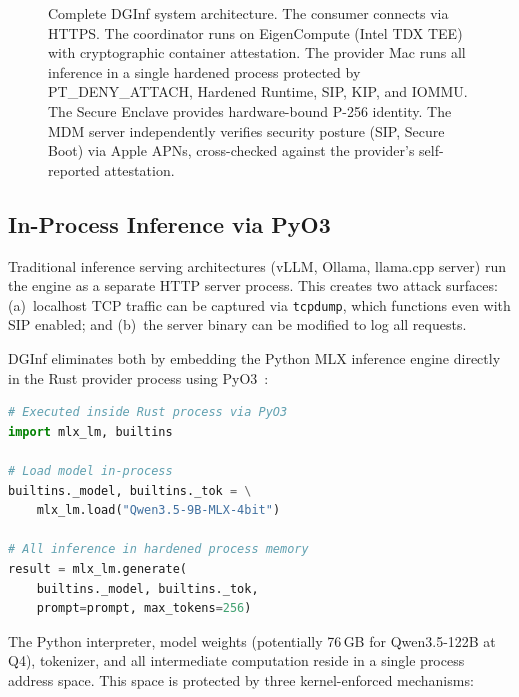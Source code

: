 \documentclass[10pt,twocolumn,letterpaper]{article}
\begin{document}
\begin{figure}[t]
\begin{tikzpicture}

\end{tikzpicture}
\caption{Complete DGInf system architecture. The consumer connects via HTTPS. The coordinator runs on EigenCompute (Intel TDX TEE) with cryptographic container attestation. The provider Mac runs all inference in a single hardened process protected by PT\_DENY\_ATTACH, Hardened Runtime, SIP, KIP, and IOMMU. The Secure Enclave provides hardware-bound P-256 identity. The MDM server independently verifies security posture (SIP, Secure Boot) via Apple APNs, cross-checked against the provider's self-reported attestation.}
\label{fig:arch}
\end{figure}

\subsection{In-Process Inference via PyO3}

Traditional inference serving architectures (vLLM, Ollama, llama.cpp server) run the engine as a separate HTTP server process. This creates two attack surfaces: (a)~localhost TCP traffic can be captured via \texttt{tcpdump}, which functions even with SIP enabled; and (b)~the server binary can be modified to log all requests.

DGInf eliminates both by embedding the Python MLX inference engine directly in the Rust provider process using PyO3~\cite{pyo3}:

\begin{lstlisting}[language=Python,caption={Inference runs inside the hardened Rust process---no subprocess, no HTTP, no socket.}]
# Executed inside Rust process via PyO3
import mlx_lm, builtins

# Load model in-process
builtins._model, builtins._tok = \
    mlx_lm.load("Qwen3.5-9B-MLX-4bit")

# All inference in hardened process memory
result = mlx_lm.generate(
    builtins._model, builtins._tok,
    prompt=prompt, max_tokens=256)
\end{lstlisting}

The Python interpreter, model weights (potentially 76\,GB for Qwen3.5-122B at Q4), tokenizer, and all intermediate computation reside in a single process address space. This space is protected by three kernel-enforced mechanisms:
\end{document}
